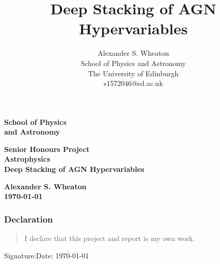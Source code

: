 \documentclass[a4paper,11pt]{article}
\title{Deep Stacking of AGN Hypervariables}
\author{
    Alexander S. Wheaton\\
    School of Physics and Astronomy\\
    The University of Edinburgh\\
    s1572046@ed.ac.uk\break
}
\begin{document}
\pagestyle{empty}                       %
\epsfxsize=40mm                         %
\begin{minipage}[b]{110mm}
    {\Huge\bf School of Physics\\ and Astronomy
    \vspace*{17mm}}
\end{minipage}
\hfill
\begin{minipage}[t]{40mm}
\end{minipage}
\par\noindent                                           %
\vspace*{2cm}
\begin{center}
    \Large\bf \Large\bf Senior Honours Project\\
    \Large\bf Astrophysics\\[10pt]                     %
    \LARGE\bf Deep Stacking of AGN Hypervariables
\end{center}
\vspace*{0.5cm}
\begin{center}
    \bf Alexander S. Wheaton\\
    \today
\end{center}
\vspace*{5mm}

\begin{abstract}
        \lipsum[1]
\end{abstract}

\vspace*{1cm}

\subsubsection*{Declaration}
\begin{quotation}
        I declare that this project and report is my own work.
\end{quotation}

Signature:\hspace*{8cm}Date: \today
\end{document}
